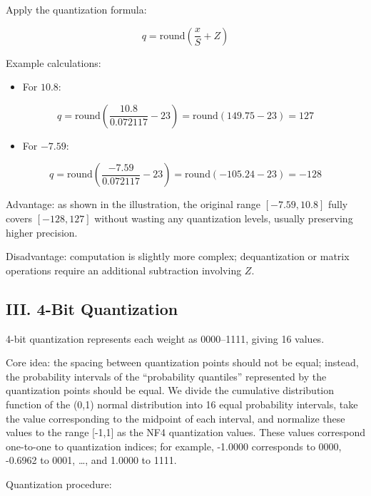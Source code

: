 Apply the quantization formula:

\[
q = \mathrm{round}\left(\frac{x}{S} + Z\right)
\]

Example calculations:

\begin{itemize}
\tightlist
\item
{}
  For \(10.8\):
\end{itemize}

\[
q = \mathrm{round}\left(\frac{10.8}{0.072117} - 23\right)
  = \mathrm{round}(149.75 - 23)
  = 127
\]

\begin{itemize}
\tightlist
\item
{}
  For \(-7.59\):
\end{itemize}

\[
q = \mathrm{round}\left(\frac{-7.59}{0.072117} - 23\right)
  = \mathrm{round}(-105.24 - 23)
  = -128
\]

Advantage: as shown in the illustration, the original range \([-7.59, 10.8]\) fully covers \([-128, 127]\) without wasting any quantization levels, usually preserving higher precision.

Disadvantage: computation is slightly more complex; dequantization or matrix operations require an additional subtraction involving \(Z\).

\hypertarget{iii.-4-bit-quantization}{%
\subsection{III. 4-Bit Quantization}\label{iii.-4-bit-quantization}}

4-bit quantization represents each weight as 0000--1111, giving 16 values.

Core idea: the spacing between quantization points should not be equal; instead, the probability intervals of the ``probability quantiles'' represented by the quantization points should be equal. We divide the cumulative distribution function of the (0,1) normal distribution into 16 equal probability intervals, take the value corresponding to the midpoint of each interval, and normalize these values to the range {[}-1,1{]} as the NF4 quantization values. These values correspond one-to-one to quantization indices; for example, -1.0000 corresponds to 0000, -0.6962 to 0001, \ldots, and 1.0000 to 1111.

Quantization procedure:

